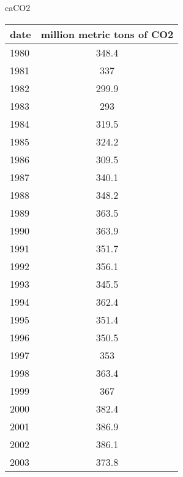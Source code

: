 \documentclass{mcmthesis}
\begin{document}
\begin{appendices}
\begin{minipage}{\textwidth}
  \begin{minipage}[t]{0.45\textwidth}
   \centering
      \makeatletter{}\makeatother\caption{caCO2}
      \begin{tabular}{|l|c|}
        \hline
        date & million metric tons of CO2 \\ \hline
        1980 & 348.4                      \\ \hline
        1981 & 337                        \\ \hline
        1982 & 299.9                      \\ \hline
        1983 & 293                        \\ \hline
        1984 & 319.5                      \\ \hline
        1985 & 324.2                      \\ \hline
        1986 & 309.5                      \\ \hline
        1987 & 340.1                      \\ \hline
        1988 & 348.2                      \\ \hline
        1989 & 363.5                      \\ \hline
        1990 & 363.9                      \\ \hline
        1991 & 351.7                      \\ \hline
        1992 & 356.1                      \\ \hline
        1993 & 345.5                      \\ \hline
        1994 & 362.4                      \\ \hline
        1995 & 351.4                      \\ \hline
        1996 & 350.5                      \\ \hline
        1997 & 353                        \\ \hline
        1998 & 363.4                      \\ \hline
        1999 & 367                        \\ \hline
        2000 & 382.4                      \\ \hline
        2001 & 386.9                      \\ \hline
        2002 & 386.1                      \\ \hline
        2003 & 373.8                      \\ \hline

\end{tabular}
\end{minipage}
\end{minipage}
\end{appendices}
\end{document}
